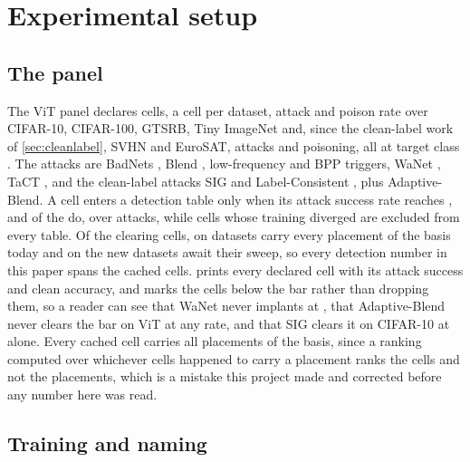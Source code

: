 \documentclass[../main.tex]{subfiles}
\begin{document}
\section{Experimental setup}

\subsection{The panel}

The ViT panel declares \PanelCellsTotal{} cells, a cell per dataset, attack and poison rate over CIFAR-10, CIFAR-100, GTSRB, Tiny ImageNet and, since the clean-label work of \cref{sec:cleanlabel}, SVHN and EuroSAT, \PanelAttacksDeclared{} attacks and \PanelRates{} poisoning, all at target class \PanelTargetLabel{}. The attacks are BadNets \citep{gu2017badnets}, Blend \citep{chen2017targeted}, low-frequency and BPP triggers, WaNet \citep{nguyen2021wanet}, TaCT \citep{tang2021demon}, and the clean-label attacks SIG and Label-Consistent \citep{turner2019label}, plus Adaptive-Blend. A cell enters a detection table only when its attack success rate reaches \AsrBar{}, and \PanelCellsClearing{} of the \PanelCellsTotal{} do, over \PanelAttacksClearing{} attacks, while \PanelCellsDiverged{} cells whose training diverged are excluded from every table. Of the clearing cells, \PanelCellsCached{} on \PanelDatasetsCached{} datasets carry every placement of the basis today and \PanelCellsAwaitingSweep{} on the new datasets await their sweep, so every detection number in this paper spans the \PanelCellsCached{} cached cells.  prints every declared cell with its attack success and clean accuracy, and marks the cells below the bar rather than dropping them, so a reader can see that WaNet never implants at \PanelRateLow{}, that Adaptive-Blend never clears the bar on ViT at any rate, and that SIG clears it on CIFAR-10 at \PanelRateHigh{} alone. Every cached cell carries all \BasisSize{} placements of the basis, since a ranking computed over whichever cells happened to carry a placement ranks the cells and not the placements, which is a mistake this project made and corrected before any number here was read.




\subsection{Training and naming}
\end{document}
